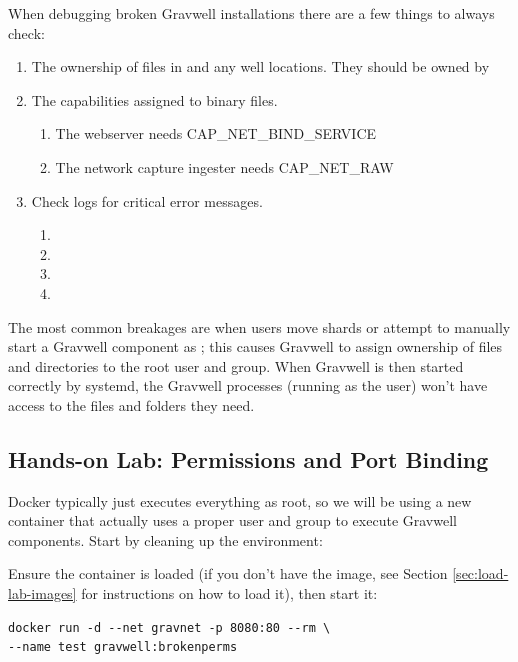 When debugging broken Gravwell installations there are a few things to
always check:

\begin{enumerate}
\item
  The ownership of files in  and any well locations. They should be owned by 
\item
  The capabilities assigned to binary files.
	\begin{enumerate}
	\item
	  The webserver needs CAP\_NET\_BIND\_SERVICE
	\item
	  The network capture ingester needs CAP\_NET\_RAW
	\end{enumerate}
\item
  Check logs for critical error messages.
	\begin{enumerate}
	\item {}
	\item {}
	\item {}
	\item {}
	\end{enumerate}
\end{enumerate}

The most common breakages are when users move shards or attempt to
manually start a Gravwell component as ; this causes Gravwell to
assign ownership of files and directories to the root user and
group. When Gravwell is then started correctly by systemd, the Gravwell
processes (running as the  user) won't have access to the
files and folders they need.

\subsection{Hands-on Lab: Permissions and Port Binding}

Docker typically just executes everything as root, so we will be using
a new container that actually uses a proper user and group to execute
Gravwell components. Start by cleaning up the environment:


Ensure the  container is loaded (if you don't have the  image, see Section \ref{sec:load-lab-images} for instructions on how to load it), then start it:

\begin{Verbatim}[breaklines=true]
docker run -d --net gravnet -p 8080:80 --rm \
--name test gravwell:brokenperms
\end{Verbatim}

